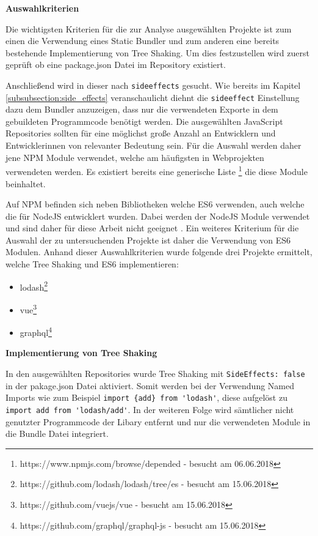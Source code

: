 \textbf{Auswahlkriterien}

Die wichtigsten Kriterien für die zur Analyse ausgewählten Projekte ist zum einen die Verwendung eines Static Bundler und zum anderen eine bereits bestehende Implementierung von Tree Shaking. Um dies festzustellen wird zuerst geprüft ob eine package.json Datei im Repository existiert.

Anschließend wird in dieser nach \lstinline{sideeffects} gesucht. Wie bereits im Kapitel \ref{subsubsection:side_effects} veranschaulicht diehnt die \lstinline{sideeffect} Einstellung dazu dem Bundler anzuzeigen, dass nur die verwendeten Exporte in dem gebuildeten Programmcode benötigt werden.
Die ausgewählten JavaScript Repositories sollten  für eine möglichst große Anzahl an Entwicklern und Entwicklerinnen von relevanter Bedeutung sein. Für die Auswahl werden daher jene NPM Module verwendet, welche am häufigsten in Webprojekten verwendeten werden. Es existiert bereits eine generische Liste \footnote{https://www.npmjs.com/browse/depended - besucht am 06.06.2018} die diese Module beinhaltet.

Auf NPM befinden sich neben Bibliotheken welche ES6 verwenden, auch welche die für NodeJS entwicklert wurden. Dabei werden der NodeJS Module verwendet und sind daher für diese Arbeit nicht geeignet \autocite{NodeJSModules}. Ein weiteres Kriterium für die Auswahl der zu untersuchenden Projekte ist daher die Verwendung von ES6 Modulen.
Anhand dieser Auswahlkriterien wurde folgende drei Projekte ermittelt, welche Tree Shaking und ES6  implementieren:

\begin{itemize}
	\item{lodash\footnote{https://github.com/lodash/lodash/tree/es - besucht am 15.06.2018}}
	\item{vue\footnote{https://github.com/vuejs/vue - besucht am 15.06.2018}}
	\item{graphql\footnote{https://github.com/graphql/graphql-js - besucht am 15.06.2018}}
\end{itemize}

\textbf{Implementierung von Tree Shaking}

In den ausgewählten Repositories wurde Tree Shaking mit \lstinline{SideEffects: false} in der pakage.json Datei aktiviert. Somit werden bei der Verwendung Named Imports wie zum Beispiel \lstinline|import {add} from 'lodash'|, diese aufgelöst zu \lstinline{import add from 'lodash/add'}. In der weiteren Folge wird sämtlicher nicht genutzter Programmcode der Libary entfernt und nur die verwendeten Module in die Bundle Datei integriert.

